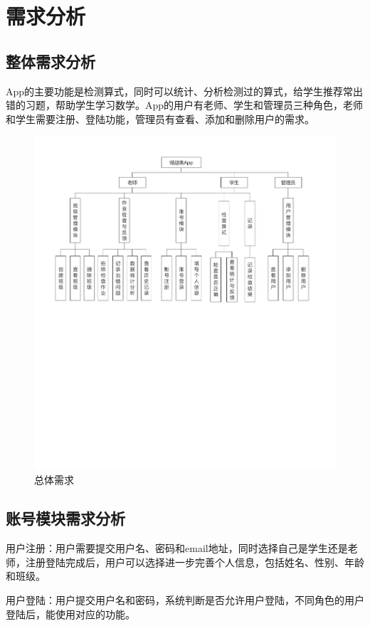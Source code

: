 

\chapter{需求分析}

\section{整体需求分析}
App的主要功能是检测算式，同时可以统计、分析检测过的算式，给学生推荐常出错的习题，帮助学生学习数学。App的用户有老师、学生和管理员三种角色，老师和学生需要注册、登陆功能，管理员有查看、添加和删除用户的需求。
\begin{figure}[h!]
	\centering
	\includegraphics[width=350bp]{picture/overallDemand.pdf}
	\caption{总体需求}
	\label{fig:}
\end{figure}

\section{账号模块需求分析}
用户注册：用户需要提交用户名、密码和email地址，同时选择自己是学生还是老师，注册登陆完成后，用户可以选择进一步完善个人信息，包括姓名、性别、年龄和班级。
\par
用户登陆：用户提交用户名和密码，系统判断是否允许用户登陆，不同角色的用户登陆后，能使用对应的功能。

